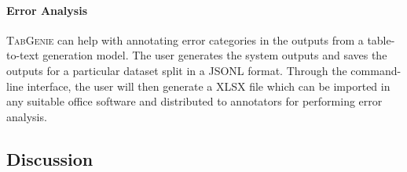 \paragraph{Error Analysis} \textsc{TabGenie} can help with annotating error categories in the outputs from a table-to-text generation model. The user generates the system outputs and saves the outputs for a particular dataset split in a JSONL format. Through the command-line interface, the user will then generate a XLSX file which can be imported in any suitable office software and distributed to annotators for performing error analysis.

\subsection{Discussion}